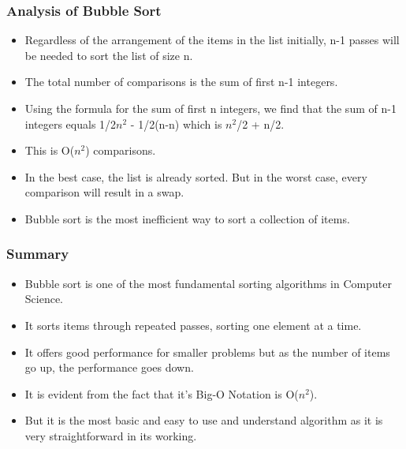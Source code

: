 \documentclass{beamer}
\begin{document}
\begin{frame}
\frametitle{Analysis of Bubble Sort}
\begin{itemize}
\item Regardless of the arrangement of the items  in the list initially, n-1 passes will be needed to sort the list of size n.
\item The total number of comparisons is the sum of first n-1 integers. 
\item Using the formula for the sum of first n integers, we find that the sum of n-1 integers equals 1/2$n^2$ - 1/2(n-n) which is $n^2$/2 + n/2. 
\item This is O($n^2$) comparisons.
\item In the best case, the list is already sorted. But in the worst case, every comparison will result in a swap. 
\item Bubble sort is the most inefficient way to sort a collection of items.
\end{itemize}
\end{frame}

\begin{frame}
\frametitle{Summary}
\begin{itemize}
\item Bubble sort is one of the most fundamental sorting algorithms in Computer Science.
\item It sorts items through repeated passes, sorting one element at a time.
\item It offers good performance for smaller problems but as the number of items  go up, the performance goes down.
\item It is evident from the fact that it's Big-O Notation is O($n^2$).
\item But it is the most basic and easy to use and understand algorithm as it is very straightforward in its working.
\end{itemize}
\end{frame}
\end{document}
